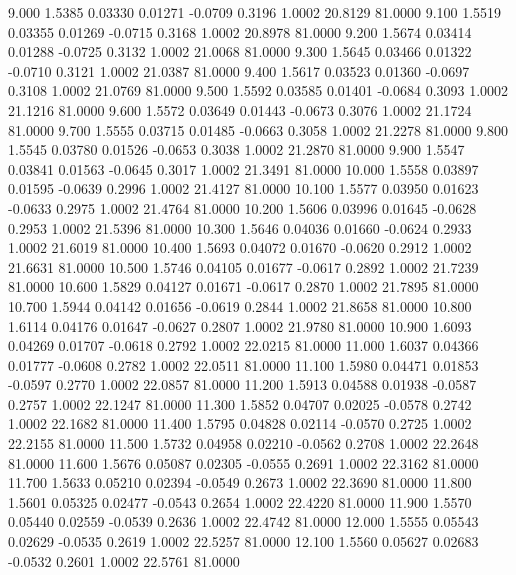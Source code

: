    9.000   1.5385   0.03330   0.01271  -0.0709   0.3196   1.0002  20.8129  81.0000
   9.100   1.5519   0.03355   0.01269  -0.0715   0.3168   1.0002  20.8978  81.0000
   9.200   1.5674   0.03414   0.01288  -0.0725   0.3132   1.0002  21.0068  81.0000
   9.300   1.5645   0.03466   0.01322  -0.0710   0.3121   1.0002  21.0387  81.0000
   9.400   1.5617   0.03523   0.01360  -0.0697   0.3108   1.0002  21.0769  81.0000
   9.500   1.5592   0.03585   0.01401  -0.0684   0.3093   1.0002  21.1216  81.0000
   9.600   1.5572   0.03649   0.01443  -0.0673   0.3076   1.0002  21.1724  81.0000
   9.700   1.5555   0.03715   0.01485  -0.0663   0.3058   1.0002  21.2278  81.0000
   9.800   1.5545   0.03780   0.01526  -0.0653   0.3038   1.0002  21.2870  81.0000
   9.900   1.5547   0.03841   0.01563  -0.0645   0.3017   1.0002  21.3491  81.0000
  10.000   1.5558   0.03897   0.01595  -0.0639   0.2996   1.0002  21.4127  81.0000
  10.100   1.5577   0.03950   0.01623  -0.0633   0.2975   1.0002  21.4764  81.0000
  10.200   1.5606   0.03996   0.01645  -0.0628   0.2953   1.0002  21.5396  81.0000
  10.300   1.5646   0.04036   0.01660  -0.0624   0.2933   1.0002  21.6019  81.0000
  10.400   1.5693   0.04072   0.01670  -0.0620   0.2912   1.0002  21.6631  81.0000
  10.500   1.5746   0.04105   0.01677  -0.0617   0.2892   1.0002  21.7239  81.0000
  10.600   1.5829   0.04127   0.01671  -0.0617   0.2870   1.0002  21.7895  81.0000
  10.700   1.5944   0.04142   0.01656  -0.0619   0.2844   1.0002  21.8658  81.0000
  10.800   1.6114   0.04176   0.01647  -0.0627   0.2807   1.0002  21.9780  81.0000
  10.900   1.6093   0.04269   0.01707  -0.0618   0.2792   1.0002  22.0215  81.0000
  11.000   1.6037   0.04366   0.01777  -0.0608   0.2782   1.0002  22.0511  81.0000
  11.100   1.5980   0.04471   0.01853  -0.0597   0.2770   1.0002  22.0857  81.0000
  11.200   1.5913   0.04588   0.01938  -0.0587   0.2757   1.0002  22.1247  81.0000
  11.300   1.5852   0.04707   0.02025  -0.0578   0.2742   1.0002  22.1682  81.0000
  11.400   1.5795   0.04828   0.02114  -0.0570   0.2725   1.0002  22.2155  81.0000
  11.500   1.5732   0.04958   0.02210  -0.0562   0.2708   1.0002  22.2648  81.0000
  11.600   1.5676   0.05087   0.02305  -0.0555   0.2691   1.0002  22.3162  81.0000
  11.700   1.5633   0.05210   0.02394  -0.0549   0.2673   1.0002  22.3690  81.0000
  11.800   1.5601   0.05325   0.02477  -0.0543   0.2654   1.0002  22.4220  81.0000
  11.900   1.5570   0.05440   0.02559  -0.0539   0.2636   1.0002  22.4742  81.0000
  12.000   1.5555   0.05543   0.02629  -0.0535   0.2619   1.0002  22.5257  81.0000
  12.100   1.5560   0.05627   0.02683  -0.0532   0.2601   1.0002  22.5761  81.0000
